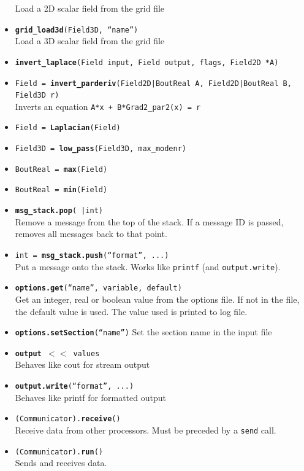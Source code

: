 \documentclass[12pt]{article}
\newcommand{\code}[1]{\texttt{#1}}
\begin{document}
\begin{itemize}
    Load a 2D scalar field from the grid file
  \item \texttt{{\bf grid\_load3d}(Field3D, ``name'')} \\
    Load a 3D scalar field from the grid file
  \item \texttt{{\bf invert\_laplace}(Field input, Field output, flags, Field2D *A)}
  \item \texttt{Field = {\bf invert\_parderiv}(Field2D|BoutReal A,
      Field2D|BoutReal B, Field3D r)} \\ Inverts an equation  \code{A*x +
      B*Grad2\_par2(x) = r}
  \item \texttt{Field = {\bf Laplacian}(Field)}
  \item \texttt{Field3D = {\bf low\_pass}(Field3D, max\_modenr)}
  \item \texttt{BoutReal = {\bf max}(Field)}
  \item \texttt{BoutReal = {\bf min}(Field)}
  \item \texttt{{\bf msg\_stack.pop}( |int)} \\ Remove a message from the top
      of the stack. If a message ID is passed, removes all messages back to
      that point.
  \item \texttt{int = {\bf msg\_stack.push}(``format'', ...)} \\
    Put a message onto the stack. Works like \code{printf} (and
    \code{output.write}).
  \item \texttt{{\bf options.get}(``name'', variable, default)} \\
    Get an integer, real or boolean value from the options file.  If not in the
    file, the default value is used. The value used is printed to log file.
  \item \texttt{{\bf options.setSection}(``name'')}
    Set the section name in the input file
  \item \texttt{{\bf output} $< <$ values} \\
    Behaves like cout for stream output
  \item \texttt{{\bf output.write}(``format'', ...)}  \\
    Behaves like printf for formatted output
  \item \texttt{(Communicator).{\bf{receive}}()} \\
    Receive data from other processors. Must be preceded by a \code{send} call.
  \item \texttt{(Communicator).{\bf{run}}()} \\
    Sends and receives data.

\end{itemize}
\end{document}
